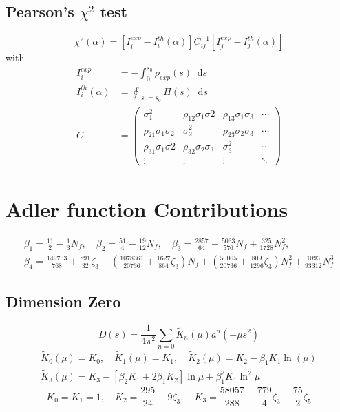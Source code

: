 \documentclass[11pt,a4paper]{article}
\newcommand*\diff{\mathop{}\!\mathrm{d}}
\begin{document}
\subsection{Pearson's $\chi^2$ test}
\begin{equation}
	\chi^2 (\alpha) = [I_i^{exp} - I_i^{th}(\alpha)] C_{ij}^{-1} [I_j^{exp} - I_j^{th}(\alpha)]
\end{equation}
with 
\begin{equation}
	\begin{split}
		I^{exp}_i &= -\int_0^{s_0} \rho_{exp}(s) \diff s \\
		I^{th}_i(\alpha) &= \oint_{|s|=s_0} \Pi(s) \diff s \\
		C &= 
		\begin{pmatrix} 
			\sigma_1^2 & \rho_{12}\sigma_1\sigma2 & \rho_{13}\sigma_1\sigma_3 & \cdots \\
			\rho_{21}\sigma_1\sigma_2 & \sigma_2^2 & \rho_{23}\sigma_2\sigma_3 & \cdots \\
			\rho_{31}\sigma_1\sigma2 & \rho_{32}\sigma_2\sigma_3 & \sigma_3^2 & \cdots \\
			\vdots & \vdots & \vdots & \ddots		
		\end{pmatrix}
	\end{split}
\end{equation}

  

\section{Adler function Contributions}
\begin{gather}
	\beta_1 = \frac{11}{2} - \frac{1}{3} N_f,  \quad \beta_2 = \frac{51}{4} - \frac{19}{12} N_f, \quad \beta_3 = \frac{2857}{64} - \frac{5033}{576}N_f + \frac{325}{1728} N_f^2, \\
	\beta_4 = \frac{149753}{768} + \frac{891}{32} \zeta_3 - \left(\frac{1078361}{20736} + \frac{1627}{864} \zeta_3\right) N_f + \left(\frac{50065}{20736} + \frac{809}{1296} \zeta_3 \right) N_f^2 + \frac{1093}{93312} N_f^3
\end{gather}
\subsection{Dimension Zero}
\begin{equation}
	D(s) = \frac{1}{4 \pi^2} \sum_{n=0} \tilde K_n (\mu) a^n (- \mu s^2)
\end{equation}
\begin{gather}
	\tilde K_0 (\mu) = K_0, \quad \tilde K_1 (\mu) = K_1, \quad \tilde K_2 (\mu) = K_2 - \beta_1 K_1 \ln (\mu) \\
	\tilde K_3 (\mu) = K_3 -[\beta_2 K_1 + 2 \beta_1 K_2] \ln \mu + \beta_1^2 K_1 \ln^2 \mu
\end{gather}
\begin{equation}
	K_0 = K_1 = 1,  \quad K_2 = \frac{295}{24} - 9 \zeta_3, \quad K_3 = \frac{58057}{288} - \frac{779}{4} \zeta_3 - \frac{75}{2} \zeta_5
\end{equation}
\end{document}
